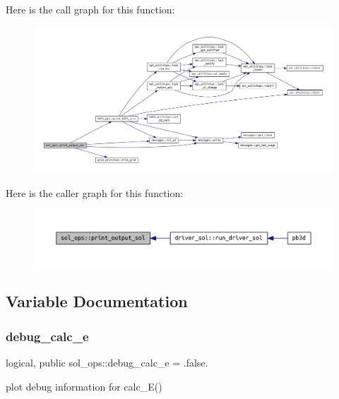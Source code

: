Here is the call graph for this function\+:\nopagebreak
\begin{figure}[H]
\begin{center}
\leavevmode
\includegraphics[width=350pt]{namespacesol__ops_a06eb95d55da45ff2a1f830a380e0cf80_cgraph}
\end{center}
\end{figure}
Here is the caller graph for this function\+:\nopagebreak
\begin{figure}[H]
\begin{center}
\leavevmode
\includegraphics[width=350pt]{namespacesol__ops_a06eb95d55da45ff2a1f830a380e0cf80_icgraph}
\end{center}
\end{figure}


\subsection{Variable Documentation}
\mbox{\label{namespacesol__ops_a4dc364bc6b70b805abdc3ed0ab2e5226}} 
\subsubsection{\texorpdfstring{debug\+\_\+calc\+\_\+e}{debug\_calc\_e}}
{\footnotesize\ttfamily logical, public sol\+\_\+ops\+::debug\+\_\+calc\+\_\+e = .false.}



plot debug information for calc\+\_\+\+E() 

